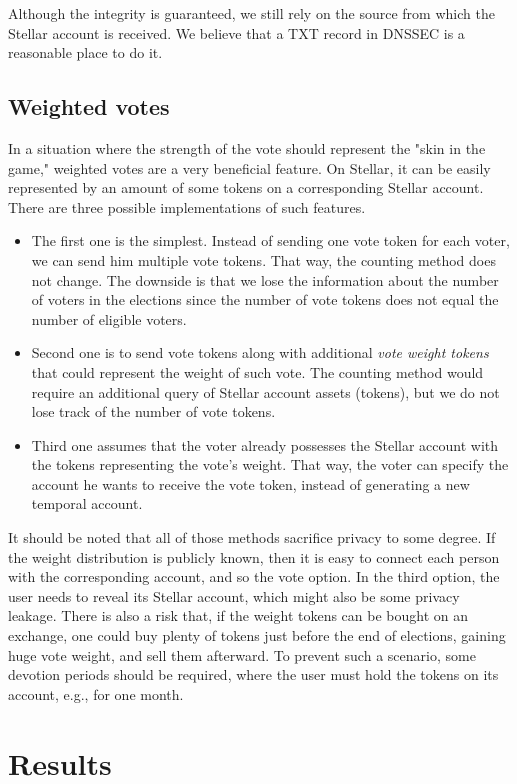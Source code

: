 \documentclass[applsci,article,submit,moreauthors,pdftex]{Definitions/mdpi}
\begin{document}
Although the integrity is guaranteed, we still rely on the source from which the Stellar account is received. We believe that a TXT record in DNSSEC is a reasonable place to do it.

\subsection{Weighted votes}
In a situation where the strength of the vote should represent the "skin in the game," weighted votes are a very beneficial feature. On Stellar, it can be easily represented by an amount of some tokens on a corresponding Stellar account. There are three possible implementations of such features. 
\begin{itemize}
    \item The first one is the simplest. Instead of sending one vote token for each voter, we can send him multiple vote tokens. That way, the counting method does not change. The downside is that we lose the information about the number of voters in the elections since the number of vote tokens does not equal the number of eligible voters.
    \item Second one is to send vote tokens along with additional \textit{vote weight tokens} that could represent the weight of such vote. The counting method would require an additional query of Stellar account assets (tokens), but we do not lose track of the number of vote tokens.
    \item Third one assumes that the voter already possesses the Stellar account with the tokens representing the vote's weight. That way, the voter can specify the account he wants to receive the vote token, instead of generating a new temporal account. 
\end{itemize}
 
It should be noted that all of those methods sacrifice privacy to some degree. If the weight distribution is publicly known, then it is easy to connect each person with the corresponding account, and so the vote option. In the third option, the user needs to reveal its Stellar account, which might also be some privacy leakage. There is also a risk that, if the weight tokens can be bought on an exchange, one could buy plenty of tokens just before the end of elections, gaining huge vote weight, and sell them afterward. To prevent such a scenario, some devotion periods should be required, where the user must hold the tokens on its account, e.g., for one month. 

\section{Results}
\label{result}
\end{document}

